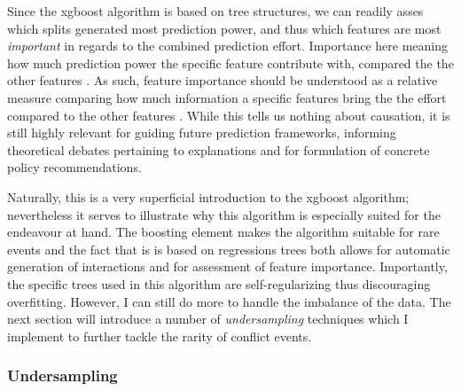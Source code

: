 \documentclass[a4paper]{article}
\begin{document}

Since the xgboost algorithm is based on tree structures, we can readily asses which splits generated most prediction power, and thus which features are most \emph{important} in regards to the combined prediction effort. Importance here meaning how much prediction power the specific feature contribute with, compared the the other features \citep[787-788]{Chen_2016}. As such, feature importance should be understood as a relative measure comparing how much information a specific features bring the the effort compared to the other features \cite[367-368]{Friedman_2001}. While this tells us nothing about causation, it is still highly relevant for guiding future prediction frameworks, informing theoretical debates pertaining to explanations and for formulation of concrete policy recommendations.\par

Naturally, this is a very superficial introduction to the xgboost algorithm; nevertheless it serves to illustrate why this algorithm is especially suited for the endeavour at hand. The boosting element makes the algorithm suitable for rare events and the fact that is is based on regressions trees both allows for automatic generation of interactions and for assessment of feature importance. Importantly, the specific trees used in this algorithm are self-regularizing thus discouraging overfitting. However, I can still do more to handle the imbalance of the data. The next section will introduce a number of \emph{undersampling} techniques which I implement to further tackle the rarity of conflict events.\par 

\subsubsection{Undersampling}

\end{document}
